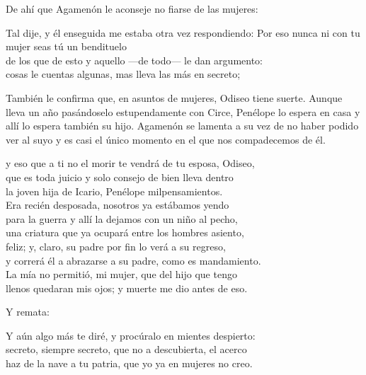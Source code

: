 De ahí que Agamenón le aconseje no fiarse de las mujeres:

\begin{versocita}
Tal dije, y él enseguida me estaba otra vez respondiendo:
\stanzabreak
Por eso nunca ni con tu mujer seas tú un bendituelo\\
de los que de esto y aquello ---de todo--- le dan argumento:\\
cosas le cuentas algunas, mas lleva las más en secreto;
\end{versocita}

También le confirma que, en asuntos de mujeres, Odiseo tiene suerte. Aunque lleva un año pasándoselo estupendamente con Circe, Penélope lo espera en casa y allí lo espera también su hijo. Agamenón se lamenta a su vez de no haber podido ver al suyo y es casi el único momento en el que nos compadecemos de él.

\begin{versocita}
y eso que a ti no el morir te vendrá de tu esposa, Odiseo,\\
que es toda juicio y solo consejo de bien lleva dentro\\
la joven hija de Icario, Penélope milpensamientos.\\
Era recién desposada, nosotros ya estábamos yendo\\
para la guerra y allí la dejamos con un niño al pecho,\\
una criatura que ya ocupará entre los hombres asiento,\\
feliz; y, claro, su padre por fin lo verá a su regreso,\\
y correrá él a abrazarse a su padre, como es mandamiento.\\
La mía no permitió, mi mujer, que del hijo que tengo\\
llenos quedaran mis ojos; y muerte me dio antes de eso.
\end{versocita}

Y remata:

\begin{versocita}
Y aún algo más te diré, y procúralo en mientes despierto:\\
secreto, siempre secreto, que no a descubierta, el acerco\\
haz de la nave a tu patria, que yo ya en mujeres no creo.
\end{versocita}

